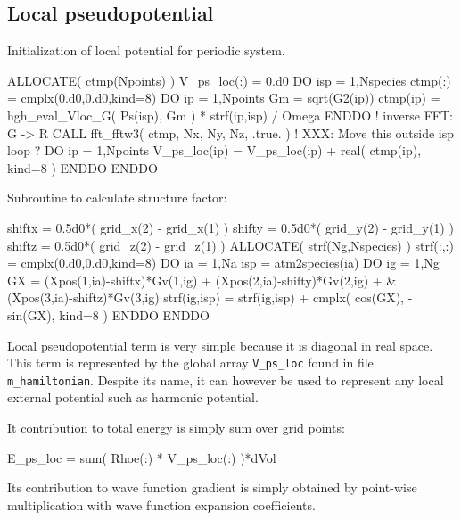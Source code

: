 \subsection{Local pseudopotential}

Initialization of local potential for periodic system.
\begin{fortrancode}
ALLOCATE( ctmp(Npoints) )
V_ps_loc(:) = 0.d0
DO isp = 1,Nspecies
  ctmp(:) = cmplx(0.d0,0.d0,kind=8)
  DO ip = 1,Npoints
    Gm = sqrt(G2(ip))
    ctmp(ip) = hgh_eval_Vloc_G( Ps(isp), Gm ) * strf(ip,isp) / Omega
  ENDDO
  ! inverse FFT: G -> R
  CALL fft_fftw3( ctmp, Nx, Ny, Nz, .true. )
  ! XXX: Move this outside isp loop ?
  DO ip = 1,Npoints
    V_ps_loc(ip) = V_ps_loc(ip) + real( ctmp(ip), kind=8 )
  ENDDO 
ENDDO 
\end{fortrancode}

Subroutine to calculate structure factor:
\begin{fortrancode}
shiftx = 0.5d0*( grid_x(2) - grid_x(1) )
shifty = 0.5d0*( grid_y(2) - grid_y(1) )
shiftz = 0.5d0*( grid_z(2) - grid_z(1) )
ALLOCATE( strf(Ng,Nspecies) )
strf(:,:) = cmplx(0.d0,0.d0,kind=8)
DO ia = 1,Na
  isp = atm2species(ia)
  DO ig = 1,Ng
    GX = (Xpos(1,ia)-shiftx)*Gv(1,ig) + (Xpos(2,ia)-shifty)*Gv(2,ig) + &
         (Xpos(3,ia)-shiftz)*Gv(3,ig)
    strf(ig,isp) = strf(ig,isp) + cmplx( cos(GX), -sin(GX), kind=8 )
  ENDDO 
ENDDO 
\end{fortrancode}

Local pseudopotential term is very simple because it is diagonal
in real space.
This term is represented by the global array {\tt V\_ps\_loc}
found in file {\tt m\_hamiltonian}. Despite its name, it can
however be used to represent any local external potential
such as harmonic potential.

It contribution to total energy is simply sum over grid
points:
\begin{fortrancode}
E_ps_loc = sum( Rhoe(:) * V_ps_loc(:) )*dVol
\end{fortrancode}

Its contribution to wave function gradient is simply obtained by
point-wise multiplication with wave function expansion
coefficients.


